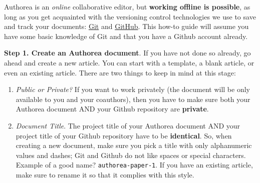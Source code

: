 Authorea is an \textit{online} collaborative editor, but \textbf{working offline is possible}, as long as you get acquainted with the versioning control technologies we use to save and track your documents: \href{http://git-scm.com/}{Git} and \href{http://github.com/}{GitHub}. This how-to guide will assume you have some basic knowledge of Git and that you have a Github account already. 

\textbf{Step 1. Create an Authorea document}. If you have not done so already, go ahead and create a new article. You can start with a template, a blank article, or even an existing article. There are two things to keep in mind at this stage:

\begin{enumerate}
\item \textit{Public or Private?} If you want to work privately (the document will be only available to you and your coauthors), then you have to make sure both your Authorea document AND your Github repository are \textbf{private}.
\item \textit{Document Title}. The project title of your Authorea document AND your project title of your Github repository have to be \textbf{identical}. So, when creating a new document, make sure you pick a title with only alphanumeric values and dashes; Git and Github do not like spaces or special characters. Example of a good name? \verb|authorea-paper-1|. If you have an existing article, make sure to rename it so that it complies with this style.
\end{enumerate}

